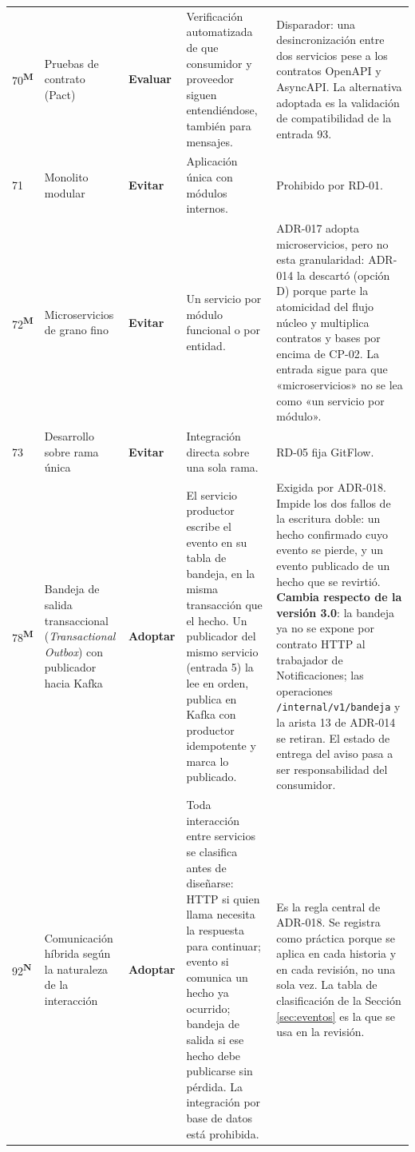 \documentclass[11pt,a4paper]{article}
\newcommand{\adoptar}{\textcolor{ringAdoptar}{\textbf{Adoptar}}}
\newcommand{\evaluar}{\textcolor{ringEvaluar}{\textbf{Evaluar}}}
\newcommand{\evitar}{\textcolor{ringEvitar}{\textbf{Evitar}}}
\newcommand{\nueva}{\textsuperscript{\textcolor{vinotinto}{\scriptsize\bfseries N}}}
\newcommand{\modif}{\textsuperscript{\textcolor{ringProbar}{\scriptsize\bfseries M}}}
\begin{document}
\begin{longtable}{L{0.8cm} L{2.6cm} L{1.6cm} L{4.1cm} L{4.5cm}}
70\modif & Pruebas de contrato (Pact) & \evaluar{} & Verificación automatizada de que consumidor y proveedor siguen entendiéndose, también para mensajes. & Disparador: una desincronización entre dos servicios pese a los contratos OpenAPI y AsyncAPI. La alternativa adoptada es la validación de compatibilidad de la entrada 93. \\

71 & Monolito modular & \evitar{} & Aplicación única con módulos internos. & Prohibido por RD-01. \\

72\modif & Microservicios de grano fino & \evitar{} & Un servicio por módulo funcional o por entidad. & ADR-017 adopta microservicios, pero no esta granularidad: ADR-014 la descartó (opción D) porque parte la atomicidad del flujo núcleo y multiplica contratos y bases por encima de CP-02. La entrada sigue para que «microservicios» no se lea como «un servicio por módulo». \\

73 & Desarrollo sobre rama única & \evitar{} & Integración directa sobre una sola rama. & RD-05 fija GitFlow. \\

78\modif & Bandeja de salida transaccional (\emph{Transactional Outbox}) con publicador hacia Kafka & \adoptar{} & El servicio productor escribe el evento en su tabla de bandeja, en la misma transacción que el hecho. Un publicador del mismo servicio (entrada 5) la lee en orden, publica en Kafka con productor idempotente y marca lo publicado. & Exigida por ADR-018. Impide los dos fallos de la escritura doble: un hecho confirmado cuyo evento se pierde, y un evento publicado de un hecho que se revirtió. \textbf{Cambia respecto de la versión 3.0}: la bandeja ya no se expone por contrato HTTP al trabajador de Notificaciones; las operaciones \texttt{/internal/v1/bandeja} y la arista 13 de ADR-014 se retiran. El estado de entrega del aviso pasa a ser responsabilidad del consumidor. \\

92\nueva & Comunicación híbrida según la naturaleza de la interacción & \adoptar{} & Toda interacción entre servicios se clasifica antes de diseñarse: HTTP si quien llama necesita la respuesta para continuar; evento si comunica un hecho ya ocurrido; bandeja de salida si ese hecho debe publicarse sin pérdida. La integración por base de datos está prohibida. & Es la regla central de ADR-018. Se registra como práctica porque se aplica en cada historia y en cada revisión, no una sola vez. La tabla de clasificación de la Sección \ref{sec:eventos} es la que se usa en la revisión. \\


\end{longtable}
\end{document}
